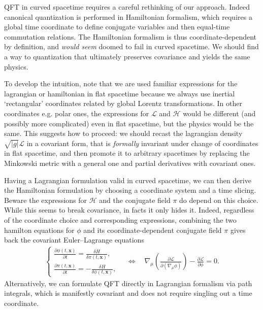 \documentclass[../QFT_main.tex]{subfiles}
\begin{document}
\begin{mytheorem}
%
QFT in curved spacetime requires a careful rethinking of our approach.
Indeed canonical quantization is performed in Hamiltonian formalism, which requires a global time coordinate to define conjugate variables and then equal-time commutation relations.
The Hamiltonian formalism is thus coordinate-dependent by definition, and \emph{would seem} doomed to fail in curved spacetime.
We should find a way to quantization that ultimately preserves covariance and yields the same physics.

To develop the intuition, note that we are used familiar expressions for the lagrangian or hamiltonian in flat spacetime because we always use inertial `rectangular' coordinates related by global Lorentz transformations.
In other coordinates e.g. polar ones, the expressions for $\mathcal{L}$ and $\mathcal{H}$ would be different (and possibly more complicated) even in flat spacetime, but the physics would be the same.
This suggests how to proceed: we should recast the lagrangian density $\sqrt{|g|}\mathcal{L}$ in a covariant form, that is \emph{formally} invariant under change of coordinates in flat spacetime, and then promote it to arbitrary spacetimes by replacing the Minkowski metric with a general one and partial derivatives with covariant ones.

Having a Lagrangian formulation valid in curved spacetime, we can then derive the Hamiltonian formulation by choosing a coordinate system and a time slicing.
Beware the expressions for $\mathcal{H}$ and the conjugate field $\pi$ do depend on this choice.
While this seems to break covariance, in facts it only hides it.
Indeed, regardless of the coordinate choice and corresponding expressions, combining the two hamilton equations for $\phi$ and its coordinate-dependent conjugate field $\pi$ gives back the covariant Euler--Lagrange equations
\begin{align}
  \begin{cases}
    \frac{\partial \phi(t,\mathbf{x})}{\partial t} = \frac{\delta H}{\delta \pi(t,\mathbf{x})}, \\
    \frac{\partial \pi(t,\mathbf{x})}{\partial t} = -\frac{\delta H}{\delta \phi(t,\mathbf{x})},
  \end{cases} \quad \Leftrightarrow \quad \nabla_\mu \left(\tfrac{\partial \mathcal{L}}{\partial (\nabla_\mu \phi)}\right) - \tfrac{\partial \mathcal{L}}{\partial \phi} = 0.
\end{align}
Alternatively, we can formulate QFT directly in Lagrangian formalism via path integrals, which is manifestly covariant and does not require singling out a time coordinate.


\end{mytheorem}
\end{document}
